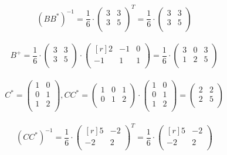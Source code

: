 \[(BB^*)^{-1} = \frac{1}{6} \cdot \begin{pmatrix}
3 & 3 \\         
3 & 5 \\
\end{pmatrix}^T = \frac{1}{6} \cdot \begin{pmatrix}
3 & 3 \\         
3 & 5 \\
\end{pmatrix}\]\\
\[B^+ = \frac{1}{6} \cdot \begin{pmatrix}
3 & 3 \\         
3 & 5 \\
\end{pmatrix} \cdot \begin{pmatrix}[r]
2 & -1 & 0 \\         
-1 & 1 & 1 \\
\end{pmatrix} = \frac{1}{6} \cdot \begin{pmatrix}
3 & 0 & 3 \\         
1 & 2 & 5 \\
\end{pmatrix}\]\\
\[C^* = \begin{pmatrix}
1 & 0 \\         
0 & 1 \\
1 & 2 \\
\end{pmatrix}, CC^* = \begin{pmatrix}
1 & 0 & 1 \\         
0 & 1 & 2 \\
\end{pmatrix} \cdot \begin{pmatrix}
1 & 0 \\         
0 & 1 \\
1 & 2 \\
\end{pmatrix} = \begin{pmatrix}
2 & 2 \\         
2 & 5 \\
\end{pmatrix}\]\\
\[(CC^*)^{-1} = \frac{1}{6} \cdot \begin{pmatrix}[r]
5 & -2 \\         
-2 & 2 \\
\end{pmatrix}^T = \frac{1}{6} \cdot \begin{pmatrix}[r]
5 & -2 \\         
-2 & 2 \\
\end{pmatrix}\]\\
